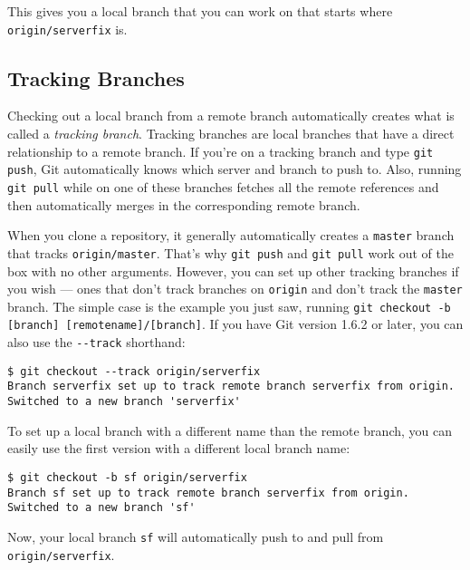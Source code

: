 \documentclass[a4paper]{book}
\begin{document}
This gives you a local branch that you can work on that starts where \texttt{origin/serverfix} is.

\subsection{Tracking Branches}\label{tracking-branches}

Checking out a local branch from a remote branch automatically creates what is called a \emph{tracking branch}. Tracking branches are local branches that have a direct relationship to a remote branch. If you're on a tracking branch and type \texttt{git push}, Git automatically knows which server and branch to push to. Also, running \texttt{git pull} while on one of these branches fetches all the remote references and then automatically merges in the corresponding remote branch.

When you clone a repository, it generally automatically creates a \texttt{master} branch that tracks \texttt{origin/master}. That's why \texttt{git push} and \texttt{git pull} work out of the box with no other arguments. However, you can set up other tracking branches if you wish --- ones that don't track branches on \texttt{origin} and don't track the \texttt{master} branch. The simple case is the example you just saw, running \texttt{git checkout -b {[}branch{]} {[}remotename{]}/{[}branch{]}}. If you have Git version 1.6.2 or later, you can also use the \texttt{-{}-track} shorthand:

\begin{shaded}\begin{verbatim}
$ git checkout --track origin/serverfix
Branch serverfix set up to track remote branch serverfix from origin.
Switched to a new branch 'serverfix'
\end{verbatim}\end{shaded}

To set up a local branch with a different name than the remote branch, you can easily use the first version with a different local branch name:

\begin{shaded}\begin{verbatim}
$ git checkout -b sf origin/serverfix
Branch sf set up to track remote branch serverfix from origin.
Switched to a new branch 'sf'
\end{verbatim}\end{shaded}

Now, your local branch \texttt{sf} will automatically push to and pull from \texttt{origin/serverfix}.
\end{document}

